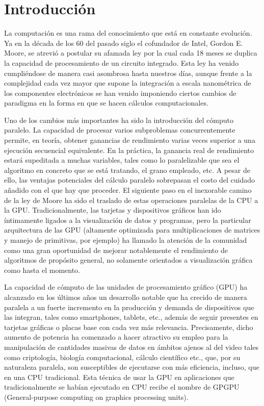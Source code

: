 \documentclass[twoside]{article}
\begin{document}
\section{Introducción}
La computación es una rama del conocimiento que está en constante evolución. Ya en la década de los 60 del pasado siglo el cofundador de Intel, Gordon E. Moore, se atrevió a postular su afamada ley por la cual cada 18 meses se duplica la capacidad de procesamiento de un circuito integrado. Esta ley ha venido cumpliéndose de manera casi asombrosa hasta nuestros días, aunque frente a la complejidad cada vez mayor que supone la integración a escala nanométrica de los componentes electrónicos se han venido imponiendo ciertos cambios de paradigma en la forma en que se hacen cálculos computacionales.

\vspace{5 mm}

Uno de los cambios más importantes ha sido la introducción del cómputo paralelo. La capacidad de procesar varios subproblemas concurrentemente permite, en teoría, obtener ganancias de rendimiento varias veces superior a una ejecución secuencial equivalente. En la práctica, la ganancia real de rendimiento estará supeditada a muchas variables, tales como lo paralelizable que sea el algoritmo en concreto que se está tratando, el grano empleado, etc. A pesar de ello, las ventajas potenciales del cálculo paralelo sobrepasan el costo del cuidado añadido con el que hay que proceder. El siguiente paso en el inexorable camino de la ley de Moore ha sido el traslado de estas operaciones paralelas de la CPU a la GPU. Tradicionalmente, las tarjetas y dispositivos gráficos han ido íntimamente ligados a la visualización de datos y programas, pero la particular arquitectura de las GPU (altamente optimizada para multiplicaciones de matrices y manejo de primitivas, por ejemplo) ha llamado la atención de la comunidad como una gran oportunidad de mejorar notablemente el rendimiento de algoritmos de propósito general, no solamente orientados a visualización gráfica como hasta el momento. 

\vspace{5 mm}

La capacidad de cómputo de las unidades de procesamiento gráfico (GPU) ha alcanzado en los últimos años un desarrollo notable que ha crecido de manera paralela a un fuerte incremento en la producción y demanda de dispositivos que las integran, tales como smartphones, tablets, etc., además de seguir presentes en tarjetas gráficas o placas base con cada vez más relevancia. Precisamente, dicho aumento de potencia ha comenzado a hacer atractivo su empleo para la manipulación de cantidades masivas de datos en ámbitos ajenos al del video tales como criptología, biología computacional, cálculo científico etc., que, por su naturaleza paralela, son susceptibles de ejecutarse con más eficiencia, incluso, que en una CPU tradicional. Esta técnica de usar la GPU en aplicaciones que tradicionalmente se habían ejecutado en CPU recibe el nombre de GPGPU (General-purpose computing on graphics processing units).
\end{document}
